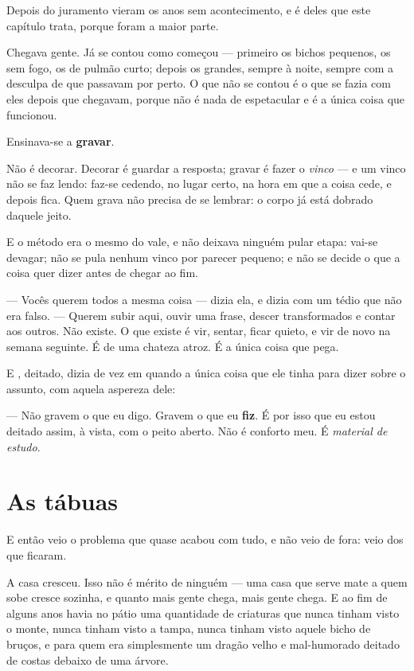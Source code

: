 \documentclass[livro.tex]{subfiles}
\begin{document}
Depois do juramento vieram os anos sem acontecimento, e é deles que este capítulo trata, porque
foram a maior parte.

\medskip

Chegava gente. Já se contou como começou --- primeiro os bichos pequenos, os sem fogo, os de
pulmão curto; depois os grandes, sempre à noite, sempre com a desculpa de que passavam por perto.
O que não se contou é o que se fazia com eles depois que chegavam, porque não é nada de
espetacular e é a única coisa que funcionou.

Ensinava-se a \textbf{gravar}.

\medskip

Não é decorar. Decorar é guardar a resposta; gravar é fazer o \emph{vinco} --- e um vinco não se
faz lendo: faz-se cedendo, no lugar certo, na hora em que a coisa cede, e depois fica. Quem grava
não precisa de se lembrar: o corpo já está dobrado daquele jeito.

E o método era o mesmo do vale, e \Qui não deixava ninguém pular etapa: vai-se devagar; não se
pula nenhum vinco por parecer pequeno; e não se decide o que a coisa quer dizer antes de chegar
ao fim.

--- Vocês querem todos a mesma coisa --- dizia ela, e dizia com um tédio que não era falso. ---
Querem subir aqui, ouvir uma frase, descer transformados e contar aos outros. Não existe. O que
existe é vir, sentar, ficar quieto, e vir de novo na semana seguinte. É de uma chateza atroz. É a
única coisa que pega.

\medskip

E \Ven , deitado, dizia de vez em quando a única coisa que ele tinha para dizer sobre o assunto,
com aquela aspereza dele:

--- Não gravem o que eu digo. Gravem o que eu \textbf{fiz}. É por isso que eu estou deitado
assim, à vista, com o peito aberto. Não é conforto meu. É \emph{material de estudo}.

\chapter{As tábuas}

E então veio o problema que quase acabou com tudo, e não veio de fora: veio dos que ficaram.

\medskip

A casa cresceu. Isso não é mérito de ninguém --- uma casa que serve mate a quem sobe cresce
sozinha, e quanto mais gente chega, mais gente chega. E ao fim de alguns anos havia no pátio uma
quantidade de criaturas que nunca tinham visto o monte, nunca tinham visto a tampa, nunca tinham
visto aquele bicho de bruços, e para quem \Ven era simplesmente um dragão velho e mal-humorado
deitado de costas debaixo de uma árvore.
\end{document}

